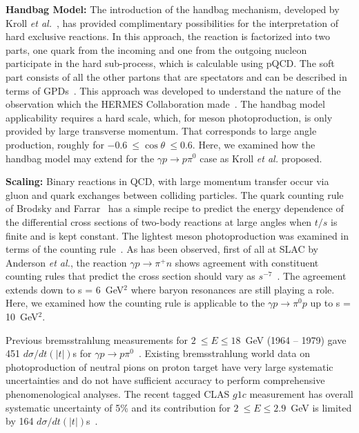 \documentclass[aps,prc,twocolumn,floatfix,showpacs,preprintnumbers,amsmath,amssymb,superscriptaddress]{revtex4-1}
\begin{document}
\textbf{Handbag Model:} The introduction of the handbag mechanism, 
developed by Kroll \textit{et al.}~\cite{Kroll}, has provided 
complimentary possibilities for the interpretation of hard 
exclusive reactions. In this approach, the reaction is factorized 
into two parts, one quark from the incoming and one from the 
outgoing nucleon participate in the hard sub-process, which is 
calculable using pQCD. The soft part consists of all the 
other partons that are spectators and can be described in 
terms of GPDs~\cite{HM}. This approach was developed to 
understand the nature of the observation which the HERMES 
Collaboration made~\cite{Moskov}.  The handbag model applicability 
requires a hard scale, which, for meson photoproduction, is only 
provided by large transverse momentum. That corresponds to large 
angle production, roughly
for $-0.6~\leq\cos\theta~\leq 0.6$.  Here, we examined how 
the handbag model may extend for the $\gamma p\to p\pi^0$ 
case as Kroll \textit{et al.} proposed.  

\textbf{Scaling:} Binary reactions in QCD, with large momentum 
transfer occur via 
gluon and quark exchanges between colliding particles. The 
quark counting rule of Brodsky and 
Farrar~\cite{Stan} has a simple recipe to predict the energy 
dependence of the differential cross sections of two-body
reactions at large angles when $t/s$ is finite and is kept 
constant.  The lightest meson photoproduction was examined 
in terms of the counting rule~\cite{Anderson,Jenkins,Zhu,
Chen,Kong}. As has been observed, first of all at SLAC by 
Anderson \textit{et al.}, the reaction $\gamma p\to\pi^+n$ 
shows agreement with constituent counting rules that predict 
the cross section should vary as $s^{-7}$~\cite{Anderson}. 
The agreement extends down to s = 6~GeV$^2$ where baryon 
resonances are still playing a role.  Here, we examined how
the counting rule is applicable to the $\gamma p\to\pi^0p$ 
up to s = 10~GeV$^2$.

Previous bremsstrahlung measurements for $2~\leq E\leq 
18$~GeV (1964 -- 1979) gave 451 $d\sigma/dt(|t|)$s for 
$\gamma p\to p\pi^0$~\cite{brem}.  Existing bremsstrahlung 
world data on photoproduction of neutral pions on proton 
target have very large systematic uncertainties and do not 
have sufficient accuracy to perform comprehensive 
phenomenological analyses.  
The recent tagged CLAS $g1c$ 
measurement has overall systematic uncertainty of 5\% and 
its contribution for $2~\leq E\leq 2.9$~GeV is limited by 
164 $d\sigma/dt(|t|)$s~\cite{du07}.  
\end{document}
